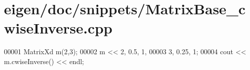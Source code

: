 \hypertarget{eigen_2doc_2snippets_2_matrix_base__cwise_inverse_8cpp_source}{}\section{eigen/doc/snippets/\+Matrix\+Base\+\_\+cwise\+Inverse.cpp}
\label{eigen_2doc_2snippets_2_matrix_base__cwise_inverse_8cpp_source}

\begin{DoxyCode}
00001 MatrixXd m(2,3);
00002 m << 2, 0.5, 1,   
00003      3, 0.25, 1;
00004 cout << m.cwiseInverse() << endl;
\end{DoxyCode}

